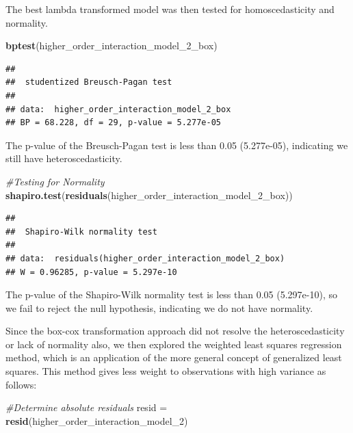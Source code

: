 \documentclass[
]{article}
\newenvironment{Shaded}{\begin{snugshade}}{\end{snugshade}}
\newcommand{\CommentTok}[1]{\textcolor[rgb]{0.56,0.35,0.01}{\textit{#1}}}
\newcommand{\FunctionTok}[1]{\textcolor[rgb]{0.13,0.29,0.53}{\textbf{#1}}}
\newcommand{\NormalTok}[1]{#1}
\newcommand{\OtherTok}[1]{\textcolor[rgb]{0.56,0.35,0.01}{#1}}
\begin{document}
The best lambda transformed model was then tested for homoscedasticity
and normality.

\begin{Shaded}
\begin{Highlighting}[]
\FunctionTok{bptest}\NormalTok{(higher\_order\_interaction\_model\_2\_box)}
\end{Highlighting}
\end{Shaded}

\begin{verbatim}
## 
##  studentized Breusch-Pagan test
## 
## data:  higher_order_interaction_model_2_box
## BP = 68.228, df = 29, p-value = 5.277e-05
\end{verbatim}

The p-value of the Breusch-Pagan test is less than 0.05 (5.277e-05),
indicating we still have heteroscedasticity.

\begin{Shaded}
\begin{Highlighting}[]
\CommentTok{\#Testing for Normality}
\FunctionTok{shapiro.test}\NormalTok{(}\FunctionTok{residuals}\NormalTok{(higher\_order\_interaction\_model\_2\_box))}
\end{Highlighting}
\end{Shaded}

\begin{verbatim}
## 
##  Shapiro-Wilk normality test
## 
## data:  residuals(higher_order_interaction_model_2_box)
## W = 0.96285, p-value = 5.297e-10
\end{verbatim}

The p-value of the Shapiro-Wilk normality test is less than 0.05
(5.297e-10), so we fail to reject the null hypothesis, indicating we do
not have normality.

Since the box-cox transformation approach did not resolve the
heteroscedasticity or lack of normality also, we then explored the
weighted least squares regression method, which is an application of the
more general concept of generalized least squares. This method gives
less weight to observations with high variance as follows:

\begin{Shaded}
\begin{Highlighting}[]
\CommentTok{\#Determine absolute residuals}
\NormalTok{resid }\OtherTok{=} \FunctionTok{resid}\NormalTok{(higher\_order\_interaction\_model\_2)}
\end{Highlighting}
\end{Shaded}
\end{document}
